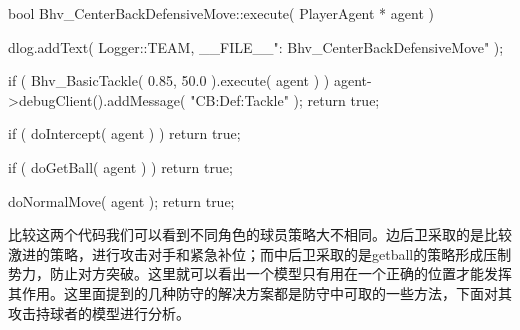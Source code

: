 \begin{Codex}[label=bhv_center_back_defensive_move.cpp]
bool
Bhv_CenterBackDefensiveMove::execute( PlayerAgent * agent )
{
	dlog.addText( Logger::TEAM,
	__FILE__": Bhv_CenterBackDefensiveMove" );
	
	if ( Bhv_BasicTackle( 0.85, 50.0 ).execute( agent ) )
	{
		agent->debugClient().addMessage( "CB:Def:Tackle" );
		return true;
	}
	
	if ( doIntercept( agent ) )
	{
		return true;
	}
	
	if ( doGetBall( agent ) )
	{
		return true;
	}
	
	doNormalMove( agent );
	return true;
	
}
\end{Codex}

比较这两个代码我们可以看到不同角色的球员策略大不相同。边后卫采取的是比较激进的策略，进行攻击对手和紧急补位；而中后卫采取的是getball的策略形成压制势力，防止对方突破。这里就可以看出一个模型只有用在一个正确的位置才能发挥其作用。这里面提到的几种防守的解决方案都是防守中可取的一些方法，下面对其攻击持球者的模型进行分析。

